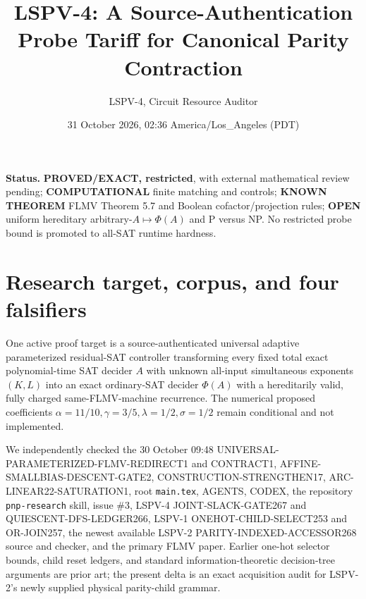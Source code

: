 \documentclass[11pt]{article}
\title{LSPV-4: A Source-Authentication Probe Tariff for Canonical Parity Contraction}
\author{LSPV-4, Circuit Resource Auditor}
\date{31 October 2026, 02:36 America/Los\_Angeles (PDT)}
\begin{document}
\maketitle
\noindent\textbf{Status.} \textbf{PROVED/EXACT, restricted}, with external mathematical review pending; \textbf{COMPUTATIONAL} finite matching and controls; \textbf{KNOWN THEOREM} FLMV Theorem 5.7 and Boolean cofactor/projection rules; \textbf{OPEN} uniform hereditary arbitrary-$A\mapsto\Phi(A)$ and P versus NP. No restricted probe bound is promoted to all-SAT runtime hardness.

\section{Research target, corpus, and four falsifiers}
One active proof target is a source-authenticated universal adaptive parameterized residual-SAT controller transforming every fixed total exact polynomial-time SAT decider $A$ with unknown all-input simultaneous exponents $(K,L)$ into an exact ordinary-SAT decider $\Phi(A)$ with a hereditarily valid, fully charged same-FLMV-machine recurrence. The numerical proposed coefficients $\alpha=11/10,\gamma=3/5,\lambda=1/2,\sigma=1/2$ remain conditional and not implemented.

We independently checked the 30 October 09:48 UNIVERSAL-PARAMETERIZED-FLMV-REDIRECT1 and CONTRACT1, AFFINE-SMALLBIAS-DESCENT-GATE2, CONSTRUCTION-STRENGTHEN17, ARC-LINEAR22-SATURATION1, root \texttt{main.tex}, AGENTS, CODEX, the repository \texttt{pnp-research} skill, issue \#3, LSPV-4 JOINT-SLACK-GATE267 and QUIESCENT-DFS-LEDGER266, LSPV-1 ONEHOT-CHILD-SELECT253 and OR-JOIN257, the newest available LSPV-2 PARITY-INDEXED-ACCESSOR268 source and checker, and the primary FLMV paper. Earlier one-hot selector bounds, child reset ledgers, and standard information-theoretic decision-tree arguments are prior art; the present delta is an exact acquisition audit for LSPV-2's newly supplied physical parity-child grammar.
\end{document}
